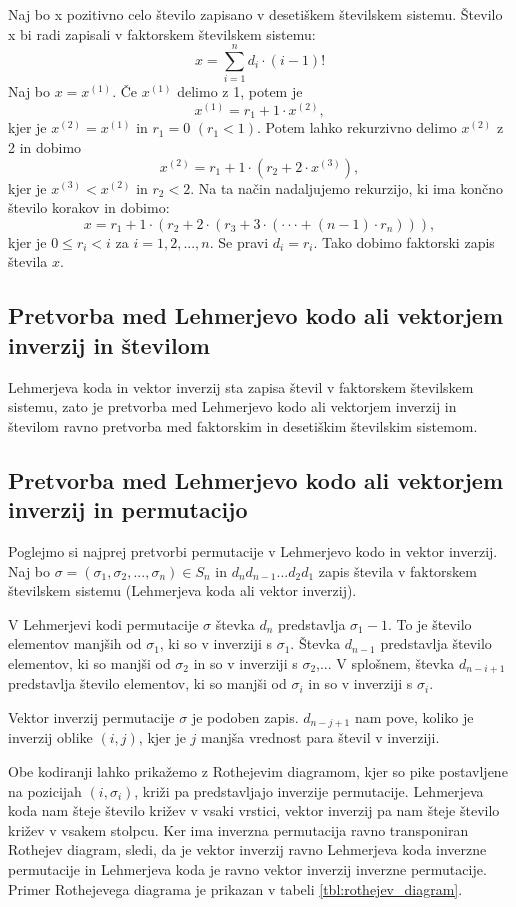 \documentclass[a4paper, 12pt]{book}
\begin{document}
Naj bo x pozitivno celo število zapisano v desetiškem številskem sistemu. Število x bi radi zapisali v faktorskem številskem sistemu: 
\[
    x = \sum_{i=1}^{n} d_i \cdot (i-1)!
\]
Naj bo $x = x^{(1)}$. Če $x^{(1)}$ delimo z 1, potem je 
\[
    x^{(1)} = r_1 + 1 \cdot x^{(2)},
\]
kjer je $x^{(2)} = x^{(1)}$ in $r_1 = 0$ $(r_1 < 1)$. Potem lahko rekurzivno delimo $x^{(2)}$ z 2 in dobimo 
\[
    x^{(2)} = r_1 + 1 \cdot (r_2 + 2 \cdot x^{(3)}),
\]
kjer je $x^{(3)} < x^{(2)}$ in $r_2 < 2$. Na ta način nadaljujemo rekurzijo, ki ima končno število korakov in dobimo:
\[
    x = r_1 + 1 \cdot (r_2 + 2 \cdot(r_3 + 3 \cdot(\cdot\cdot\cdot + (n-1) \cdot r_n))),
\]
kjer je $0 \leq r_i < i$ za $i = 1, 2, ..., n$. Se pravi $d_i = r_i$. Tako dobimo faktorski zapis števila $x$.

\subsection{ Pretvorba med Lehmerjevo kodo ali vektorjem inverzij in številom }
Lehmerjeva koda in vektor inverzij sta zapisa števil v faktorskem številskem sistemu, zato je pretvorba med Lehmerjevo kodo ali vektorjem inverzij in številom ravno pretvorba med faktorskim in desetiškim številskim sistemom.

\subsection{ Pretvorba med Lehmerjevo kodo ali vektorjem inverzij in permutacijo }
Poglejmo si najprej pretvorbi permutacije v Lehmerjevo kodo in vektor inverzij. Naj bo $\sigma = (\sigma_1, \sigma_2, ..., \sigma_n) \in S_n$ in $d_nd_{n-1}...d_2d_1$ zapis števila v faktorskem številskem sistemu (Lehmerjeva koda ali vektor inverzij).

V Lehmerjevi kodi permutacije $\sigma$ števka $d_n$ predstavlja $\sigma_1 - 1$. To je število elementov manjših od $\sigma_1$, ki so v inverziji s $\sigma_1$. Števka $d_{n-1}$ predstavlja število elementov, ki so manjši od $\sigma_2$ in so v inverziji s $\sigma_2$,... V splošnem, števka $d_{n-i+1}$ predstavlja število elementov, ki so manjši od $\sigma_i$ in so v inverziji s $\sigma_i$.

Vektor inverzij permutacije $\sigma$ je podoben zapis. $d_{n-j+1}$ nam pove, koliko je inverzij oblike $(i, j)$, kjer je $j$ manjša vrednost para števil v inverziji.

Obe kodiranji lahko prikažemo z Rothejevim diagramom, kjer so pike postavljene na pozicijah $(i, \sigma_i)$, križi pa predstavljajo inverzije permutacije. Lehmerjeva koda nam šteje število križev v vsaki vrstici, vektor inverzij pa nam šteje število križev v vsakem stolpcu. Ker ima inverzna permutacija ravno transponiran Rothejev diagram, sledi, da je vektor inverzij ravno Lehmerjeva koda inverzne permutacije in Lehmerjeva koda je ravno vektor inverzij inverzne permutacije. Primer Rothejevega diagrama je prikazan v tabeli \ref{tbl:rothejev_diagram}.
\end{document}
